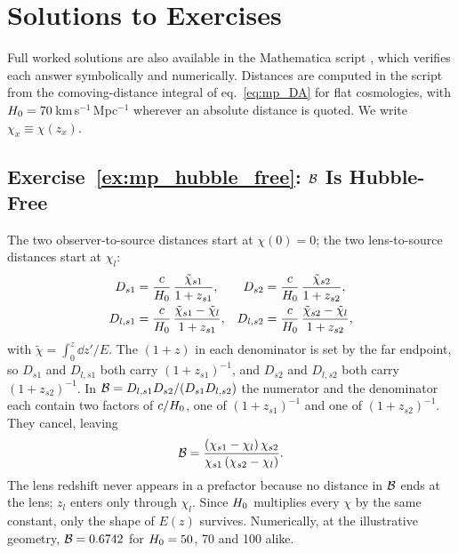 
\section{Solutions to Exercises}
\label{sec:mp_solutions}

\noindent
Full worked solutions are also available in the Mathematica script
,
which verifies each answer symbolically and numerically.  Distances are
computed in the script from the comoving-distance integral of
eq.~\eqref{eq:mp_DA} for flat cosmologies, with
$H_0=70$\,km\,s$^{-1}$\,Mpc$^{-1}$ wherever an absolute distance is
quoted.  We write $\chi_x\equiv\chi(z_x)$.

\subsection*{Exercise~\ref{ex:mp_hubble_free}: $\mathcal{B}$ Is Hubble-Free}

The two observer-to-source distances start at $\chi(0)=0$; the two
lens-to-source distances start at $\chi_l$:
\begin{align*}
  D_{s1} &= \frac{c}{H_0}\,\frac{\tilde\chi_{s1}}{1+z_{s1}}, &
  D_{s2} &= \frac{c}{H_0}\,\frac{\tilde\chi_{s2}}{1+z_{s2}}, \\
  D_{l,s1} &= \frac{c}{H_0}\,\frac{\tilde\chi_{s1}-\tilde\chi_l}{1+z_{s1}}, &
  D_{l,s2} &= \frac{c}{H_0}\,\frac{\tilde\chi_{s2}-\tilde\chi_l}{1+z_{s2}},
\end{align*}
with $\tilde\chi=\int_0^z\dd z'/E$.  The $(1+z)$ in each denominator is
set by the far endpoint, so $D_{s1}$ and $D_{l,s1}$ both carry
$(1+z_{s1})^{-1}$, and $D_{s2}$ and $D_{l,s2}$ both carry
$(1+z_{s2})^{-1}$.  In
$\mathcal{B}=D_{l,s1}D_{s2}/(D_{s1}D_{l,s2})$ the numerator and the
denominator each contain two factors of $c/H_0$, one of
$(1+z_{s1})^{-1}$ and one of $(1+z_{s2})^{-1}$.  They cancel, leaving
\begin{equation*}
  \mathcal{B} = \frac{(\chi_{s1}-\chi_l)\,\chi_{s2}}{\chi_{s1}\,(\chi_{s2}-\chi_l)} .
\end{equation*}
The lens redshift never appears in a prefactor because no distance in
$\mathcal{B}$ ends at the lens; $z_l$ enters only through $\chi_l$.
Since $H_0$ multiplies every $\chi$ by the same constant, only the
shape of $E(z)$ survives.  Numerically, at the illustrative
geometry, $\mathcal{B}=0.6742$ for $H_0=50$, 70 and 100 alike.

